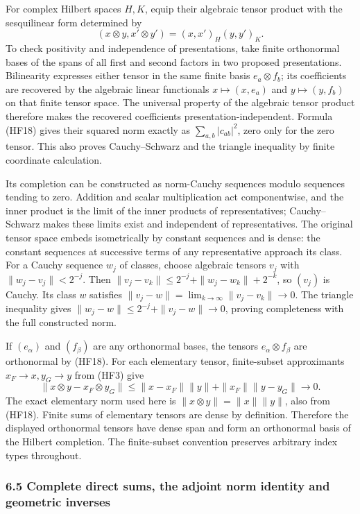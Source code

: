 \documentclass[
  11pt,
]{article}
\begin{document}
For complex Hilbert spaces \(H,K\), equip their algebraic tensor product
with the sesquilinear form determined by \[
 (x\otimes y,x'\otimes y')=(x,x')_H(y,y')_K.
 \tag{HF18}
\] To check positivity and independence of presentations, take finite
orthonormal bases of the spans of all first and second factors in two
proposed presentations. Bilinearity expresses either tensor in the same
finite basis \(e_a\otimes f_b\); its coefficients are recovered by the
algebraic linear functionals \(x\mapsto(x,e_a)\) and \(y\mapsto(y,f_b)\)
on that finite tensor space. The universal property of the algebraic
tensor product therefore makes the recovered coefficients
presentation-independent. Formula (HF18) gives their squared norm
exactly as \(\sum_{a,b}|c_{ab}|^2\), zero only for the zero tensor. This
also proves Cauchy--Schwarz and the triangle inequality by finite
coordinate calculation.

Its completion can be constructed as norm-Cauchy sequences modulo
sequences tending to zero. Addition and scalar multiplication act
componentwise, and the inner product is the limit of the inner products
of representatives; Cauchy--Schwarz makes these limits exist and
independent of representatives. The original tensor space embeds
isometrically by constant sequences and is dense: the constant sequences
at successive terms of any representative approach its class. For a
Cauchy sequence \(w_j\) of classes, choose algebraic tensors \(v_j\)
with \(\|w_j-v_j\|<2^{-j}\). Then
\(\|v_j-v_k\|\leq2^{-j}+\|w_j-w_k\|+2^{-k}\), so \((v_j)\) is Cauchy.
Its class \(w\) satisfies
\(\|v_j-w\|=\lim_{k\to\infty}\|v_j-v_k\|\to0\). The triangle inequality
gives \(\|w_j-w\|\leq2^{-j}+\|v_j-w\|\to0\), proving completeness with
the full constructed norm.

If \((e_\alpha)\) and \((f_\beta)\) are any orthonormal bases, the
tensors \(e_\alpha\otimes f_\beta\) are orthonormal by (HF18). For each
elementary tensor, finite-subset approximants \(x_F\to x,y_G\to y\) from
(HF3) give \[
 \|x\otimes y-x_F\otimes y_G\|
 \leq\|x-x_F\|\|y\|+\|x_F\|\|y-y_G\|\longrightarrow0.
 \tag{HF19}
\] The exact elementary norm used here is \(\|x\otimes y\|=\|x\|\|y\|\),
also from (HF18). Finite sums of elementary tensors are dense by
definition. Therefore the displayed orthonormal tensors have dense span
and form an orthonormal basis of the Hilbert completion. The
finite-subset convention preserves arbitrary index types throughout.

\subsubsection{6.5 Complete direct sums, the adjoint norm identity and
geometric
inverses}\label{complete-direct-sums-the-adjoint-norm-identity-and-geometric-inverses}
\end{document}
